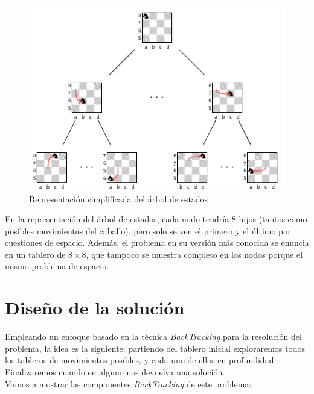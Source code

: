 \documentclass[11pt]{article}
\begin{document}
\begin{figure}[h]
  \centering
\includegraphics[scale=1.3]{img/arbol-estados.pdf}
\caption{Representación simplificada del árbol de estados} \label{fig:árbol}
\end{figure}

En la representación del árbol de estados, cada nodo tendría 8 hijos (tantos como posibles movimientos del caballo), pero solo se ven el primero y el último por cuestiones de espacio. Además, el problema en su versión más conocida se enuncia en un tablero de $8\times 8$, que tampoco se muestra completo en los nodos porque el mismo problema de espacio.

\section*{Diseño de la solución}

Empleando un enfoque basado en la técnica \textit{BackTracking} para la resolución del problema, la idea es la siguiente: partiendo del tablero inicial exploraremos todos los tableros de movimientos posibles, y cada uno de ellos en profundidad. Finalizaremos cuando en alguno nos devuelva una solución.\\

Vamos a mostrar las componentes \textit{BackTracking} de este problema:
\end{document}
